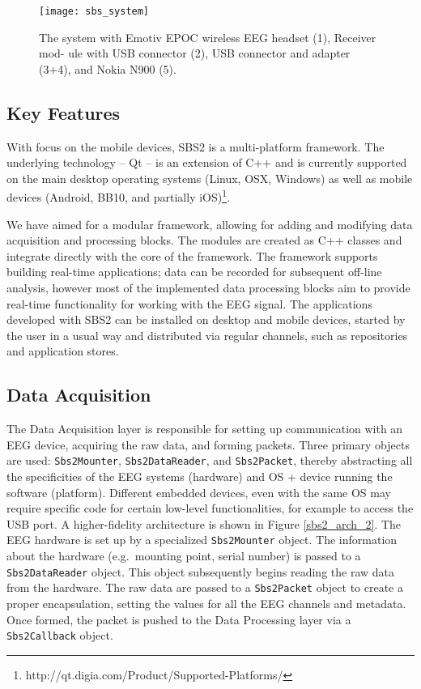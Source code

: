 \documentclass[10pt]{article}
\begin{document}
\begin{figure}[!t]
\centering
\texttt{[image: sbs\_system]}
\caption{The system with Emotiv EPOC wireless EEG headset (1), Receiver mod- ule with USB connector (2), USB connector and adapter (3+4), and Nokia N900 (5).}
\label{fig:sbs_system}
\end{figure}

	\subsection{Key Features}
With focus on the mobile devices, SBS2 is a multi-platform framework. The underlying technology -- Qt -- is an extension of C++ and is currently supported on the main desktop operating systems (Linux, OSX, Windows) as well as mobile devices (Android, BB10, and partially iOS)\footnote{http://qt.digia.com/Product/Supported-Platforms/}.

We have aimed for a modular framework, allowing for adding and modifying data acquisition and processing blocks. The modules are created as C++ classes and integrate directly with the core of the framework. The framework supports building real-time applications; data can be recorded for subsequent off-line analysis, however most of the implemented data processing blocks aim to provide real-time functionality for working with the EEG signal. The applications developed with SBS2 can be installed on desktop and mobile devices, started by the user in a usual way and distributed via regular channels, such as repositories and application stores.

	\subsection{Data Acquisition}
The Data Acquisition layer is responsible for setting up communication with an EEG device, acquiring the raw data, and forming packets. Three primary objects are used: {\tt Sbs2Mounter}, {\tt Sbs2DataReader}, and {\tt Sbs2Packet}, thereby abstracting all the specificities of the EEG systems (hardware) and OS + device running the software (platform). Different embedded devices, even with the same OS may require specific code for certain low-level functionalities, for example to access the USB port.
A higher-fidelity architecture is shown in Figure \ref{sbs2_arch_2}. The EEG hardware is set up by a specialized {\tt Sbs2Mounter} object. The information about the hardware (e.g.~mounting point, serial number) is passed to a {\tt Sbs2DataReader} object. This object subsequently begins reading the raw data from the hardware. The raw data are passed to a {\tt Sbs2Packet} object to create a proper encapsulation, setting the values for all the EEG channels and metadata. Once formed, the packet is pushed to the Data Processing layer via a {\tt Sbs2Callback} object.
\end{document}
